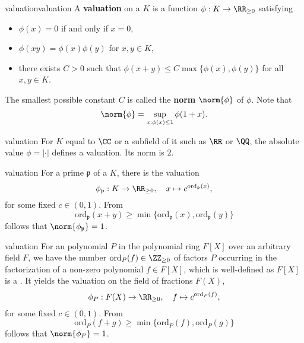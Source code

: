 \begin{topic}{valuation}{valuation}
    A \textbf{valuation} on a  $K$ is a function $\phi : K \to \RR_{\ge 0}$ satisfying
    \begin{itemize}
        \item $\phi(x) = 0$ if and only if $x = 0$,
        \item $\phi(xy) = \phi(x) \phi(y)$ for $x, y \in K$,
        \item there exists $C > 0$ such that $\phi(x + y) \le C \max \{ \phi(x), \phi(y) \}$ for all $x, y \in K$.
    \end{itemize}
    The smallest possible constant $C$ is called the \textbf{norm} $\norm{\phi}$ of $\phi$. Note that
    \[ \norm{\phi} = \sup_{x : \phi(x) \le 1} \phi(1 + x) . \]
\end{topic}

\begin{example}{valuation}
    For $K$ equal to $\CC$ or a subfield of it such as $\RR$ or $\QQ$, the absolute value $\phi = |\cdot|$ defines a valuation. Its norm is $2$.
\end{example}

\begin{example}{valuation}
    For a prime $\mathfrak{p}$ of a  $K$, there is the valuation
    \[ \phi_\mathfrak{p} : K \to \RR_{\ge 0}, \quad x \mapsto c^{\text{ord}_\mathfrak{p}(x)} , \]
    for some fixed $c \in (0, 1)$. From
    \[ \text{ord}_\mathfrak{p}(x + y) \ge \min \{ \text{ord}_\mathfrak{p}(x), \text{ord}_\mathfrak{p}(y) \} \]
    follows that $\norm{\phi_\mathfrak{p}} = 1$.
\end{example}

\begin{example}{valuation}
    For an  polynomial $P$ in the polynomial ring $F[X]$ over an arbitrary field $F$, we have the number $\text{ord}_P(f) \in \ZZ_{\ge 0}$ of factors $P$ occurring in the factorization of a non-zero polynomial $f \in F[X]$, which is well-defined as $F[X]$ is a . It yields the valuation on the field of fractions $F(X)$,
    \[ \phi_P : F(X) \to \RR_{\ge 0}, \quad f \mapsto c^{\text{ord}_P(f)} ,  \]
    for some fixed $c \in (0, 1)$. From
    \[ \text{ord}_P(f + g) \ge \min \{ \text{ord}_P(f), \text{ord}_P(g) \} \]
    follows that $\norm{\phi_P} = 1$.
\end{example}

